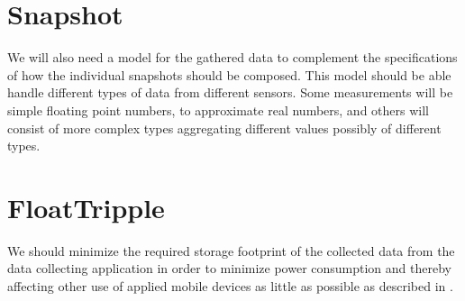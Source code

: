 
\section{Snapshot}
\label{sec:snapshot}

We will also need a model for the gathered data to complement the specifications of how the individual snapshots should be composed. This model should be able handle different types of data from different sensors. Some measurements will be simple floating point numbers, to approximate real numbers, and others will consist of more complex types aggregating different values possibly of different types.  

\section{FloatTripple}
We should minimize the required storage footprint of the collected data from the data collecting application in order to minimize power consumption and thereby affecting other use of applied mobile devices as little as possible as described in .

